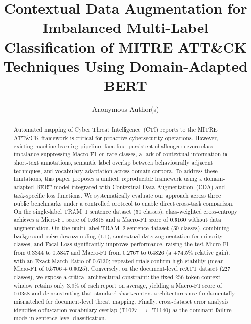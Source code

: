 \documentclass[runningheads]{llncs}
\begin{document}
\title{Contextual Data Augmentation for Imbalanced Multi-Label Classification of MITRE ATT\&CK Techniques Using Domain-Adapted BERT}


\author{Anonymous Author(s)}



\maketitle

\begin{abstract}
Automated mapping of Cyber Threat Intelligence~(CTI) reports to the MITRE ATT\&CK framework is critical for proactive cybersecurity operations. However, existing machine learning pipelines face four persistent challenges: severe class imbalance suppressing Macro-F1 on rare classes, a lack of contextual information in short-text annotations, semantic label overlap between behaviourally adjacent techniques, and vocabulary adaptation across domain corpora. To address these limitations, this paper proposes a unified, reproducible framework using a domain-adapted BERT model integrated with Contextual Data Augmentation~(CDA) and task-specific loss functions. We systematically evaluate our approach across three public benchmarks under a controlled protocol to enable direct cross-task comparison. On the single-label TRAM~1 sentence dataset (50 classes), class-weighted cross-entropy achieves a Micro-F1 score of 0.6818 and a Macro-F1 score of 0.6160 without data augmentation. On the multi-label TRAM~2 sentence dataset (50 classes), combining background-noise downsampling (1:1), contextual data augmentation for minority classes, and Focal Loss significantly improves performance, raising the test Micro-F1 from 0.3344 to 0.5847 and Macro-F1 from 0.2767 to 0.4826 (a +74.5\% relative gain), with an Exact Match Ratio of 0.6130; repeated trials confirm high stability (mean Micro-F1 of $0.5706 \pm 0.0025$). Conversely, on the document-level rcATT dataset (227 classes), we expose a critical architectural constraint: the fixed 256-token context window retains only 3.9\% of each report on average, yielding a Macro-F1 score of 0.0368 and demonstrating that standard short-context architectures are fundamentally mismatched for document-level threat mapping. Finally, cross-dataset error analysis identifies obfuscation vocabulary overlap (T1027~$\to$~T1140) as the dominant failure mode in sentence-level classification.

\end{abstract}
\end{document}
